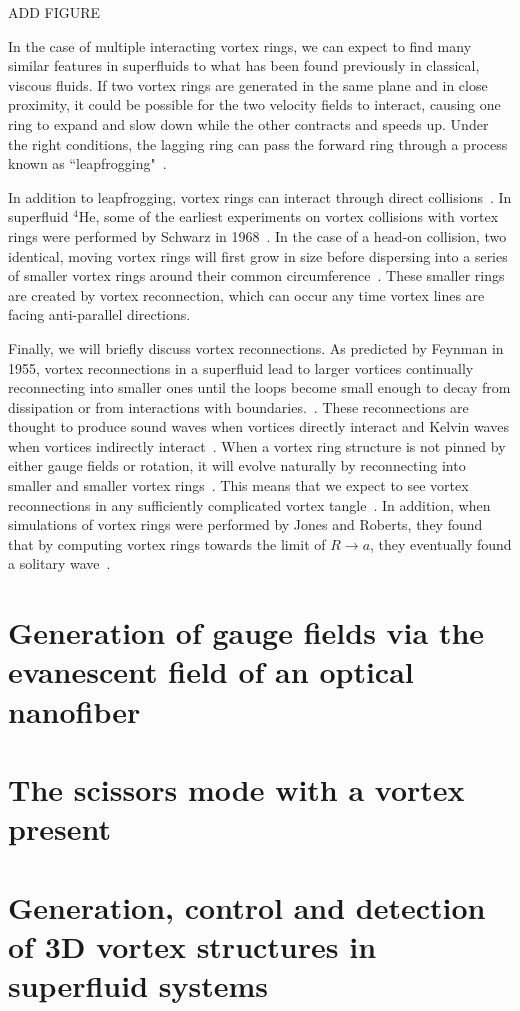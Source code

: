 ADD FIGURE

In the case of multiple interacting vortex rings, we can expect to find many similar features in superfluids to what has been found previously in classical, viscous fluids. 
If two vortex rings are generated in the same plane and in close proximity, it could be possible for the two velocity fields to interact, causing one ring to expand and slow down while the other contracts and speeds up. 
Under the right conditions, the lagging ring can pass the forward ring through a process known as ``leapfrogging"~\cite{Sommerfield1950, Caplan2014}.

In addition to leapfrogging, vortex rings can interact through direct collisions~\cite{Shariff1992}. 
In superfluid $^4$He, some of the earliest experiments on vortex collisions with vortex rings were performed by Schwarz in 1968~\cite{Schwarz1968}.
In the case of a head-on collision, two identical, moving vortex rings will first grow in size before dispersing into a series of smaller vortex rings around their common circumference~\cite{Lim1995}. 
These smaller rings are created by vortex reconnection, which can occur any time vortex lines are facing anti-parallel directions.

Finally, we will briefly discuss vortex reconnections.
As predicted by Feynman in 1955, vortex reconnections in a superfluid lead to larger vortices continually reconnecting into smaller ones until the loops become small enough to decay from dissipation or from interactions with boundaries.~\cite{Feynman1955}.
These reconnections are thought to produce sound waves when vortices directly interact and Kelvin waves when vortices indirectly interact~\cite{Paoletti2011}.
When a vortex ring structure is not pinned by either gauge fields or rotation, it will evolve naturally by reconnecting into smaller and smaller vortex rings~\cite{Jackson1999}. 
This means that we expect to see vortex reconnections in any sufficiently complicated vortex tangle~\cite{Barenghi2014}.
In addition, when simulations of vortex rings were performed by Jones and Roberts, they found that by computing vortex rings towards the limit of $R \rightarrow a$, they eventually found a solitary wave~\cite{Jones1982, Berloff2005}.


\section{Generation of gauge fields via the evanescent field of an optical nanofiber}

\section{The scissors mode with a vortex present}

\section{Generation, control and detection of 3D vortex structures in superfluid
 systems}
